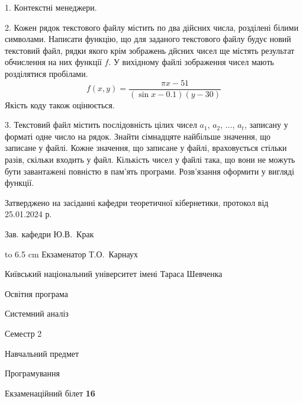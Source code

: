 \documentclass[12pt, ukrainian]{article}
\begin{document}
{%
1. Контекстні менеджери.%
\par
\vspace{2mm}

2. Кожен рядок текстового файлу містить по два дійсних числа, розділені білими символами.
Написати функцію, що для заданого текстового файлу будує новий текстовий файл, рядки якого крім зображень дйсних чисел ще містять результат обчислення на них функції $f$. У вихідному файлі зображення чисел мають розділятися пробілами. 
$$f(x, y) =\frac{\pi x - 51}{(\sin x - 0.1) (y - 30)}$$ 
Якість коду також оцінюється.

\par
\vspace{2mm}

3. Текстовий файл містить послідовність цілих чисел $a_1$, $a_2$, $\ldots$, $a_t$, записану у форматі одне число на рядок. Знайти сімнадцяте найбільше значення, що записане у файлі. Кожне значення, що записане у файлі, враховується стільки разів, скільки входить у файл. Кількість чисел у файлі така, що вони не можуть бути завантажені повністю в пам'ять програми. Розв'язання оформити у вигляді функції.

}
{\smallskip\smallskip \begin {scriptsize} Затверджено на засіданні кафедри теоретичної кібернетики, протокол   від   25.01.2024 р.\par\smallskip\smallskip\smallskip\smallskip
{\parbox {6.5 cm} {Зав. кафедри \dotfill Ю.В.~Крак}}\hspace {0.7cm} {\hbox to 6.5 cm { Екзаменатор \dotfill Т.О.~Карнаух}} \end{scriptsize}}
\vspace{0.9cm}
{{\begin {scriptsize}\par
{ \center  Київський національний університет імені Тараса Шевченка \par}
{\parbox {5 cm}{Освітня програма \hfill}{\parbox {7 cm}{Системний аналіз\hfill}}\parbox {6 cm}{\hfill Семестр 2}}\par
{\parbox {5 cm} {Навчальний предмет \hfill}\parbox {7 cm}{Програмування \hfill}\parbox {6cm}{\hfill}\par}\vspace{-15pt} \end{scriptsize}}{\center Екзаменаційний білет \No \textbf { 16 }\par}}
\end{document}
